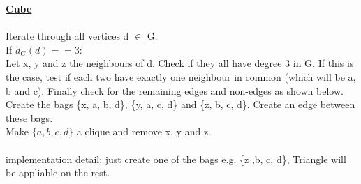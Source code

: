 \documentclass[a4wide]{article}
\begin{document}
\begin{minipage}{0.5\textwidth}
\underline{\textbf{Cube}} \cite{A_P_rec} \\ \\
Iterate through all vertices d $\in$ G. \\
If $d_{G}(d) == 3$: \\
Let x, y and z the neighbours of d. Check if they all have degree 3 in G. If this is the case, test if each two have exactly one neighbour in common (which will be a, b and c). Finally check for the remaining edges and non-edges as shown below. 
Create the bags \{x, a, b, d\}, \{y, a, c, d\} and \{z, b, c, d\}. Create an edge between these bags. \\
Make $\{a,b,c,d\}$ a clique and remove x, y and z.\\  \\
\underline{implementation detail}: just create one of the bags e.g. \{z ,b, c, d\}, Triangle will be appliable on the rest. \\ 
\end{minipage}
\hspace{2.0cm}
\begin{minipage}{0.5\textwidth}
 \\
\end{minipage}

\vspace*{0.5cm}
\end{document}
